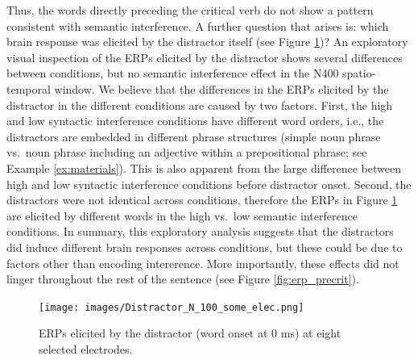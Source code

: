 \documentclass[a4paper, man, floatsintext]{apa7}
\begin{document}
Thus, the words directly preceding the critical verb do not show a pattern consistent with semantic interference. A further question that arises is: which brain response was elicited by the distractor itself (see Figure \ref{fig:erp_distractor})? An exploratory visual inspection of the ERPs elicited by the distractor shows several differences between conditions, but no semantic interference effect in the N400 spatio-temporal window. We believe that the differences in the ERPs elicited by the distractor in the different conditions are caused by two factors. First, the high and low syntactic interference conditions have different word orders, i.e., the distractors are embedded in different phrase structures (simple noun phrase vs.\ noun phrase including an adjective within a prepositional phrase; see Example \ref{ex:materials}). This is also apparent from the large difference between high and low syntactic interference conditions before distractor onset. Second, the distractors were not identical across conditions, therefore the ERPs in Figure \ref{fig:erp_distractor} are elicited by different words in the high vs.\ low semantic interference conditions. In summary, this exploratory analysis suggests that the distractors did induce different brain responses across conditions, but these could be due to factors other than encoding intererence. More importantly, these effects did not linger throughout the rest of the sentence (see Figure \ref{fig:erp_precrit}). 

\begin{figure}[H]
    \centering
        \caption{ERPs elicited by the distractor (word onset at 0 ms) at eight selected electrodes.}
    \label{fig:erp_distractor}\texttt{[image: images/Distractor\_N\_100\_some\_elec.png]}
\end{figure}
\end{document}
